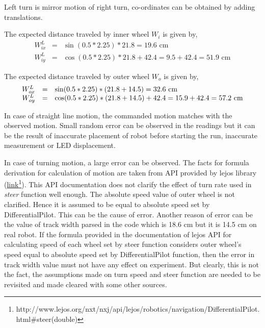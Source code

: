 \begin{enumerate}
	Left turn is mirror motion of right turn, co-ordinates can be obtained by adding translations. 
	
	The expected distance traveled by inner wheel $W_i$ is given by,
	\begin{equation}
	\begin{array}{rcl}
	W^L_{ix} &=& \sin(0.5 * 2.25) * 21.8 = 19.6 \text{ cm} \\
	W^L_{iy} &=& \cos(0.5 * 2.25) * 21.8 + 42.4 = 9.5 + 42.4 = 51.9 \text{ cm}
	\end{array}
	\end{equation}
	
	The expected distance traveled by outer wheel $W_o$ is given by,
	\begin{equation}
	\begin{array}{rcl}
	W^L_{ox} &=& \sin(0.5 * 2.25) * (21.8 + 14.5) = 32.6 \text{ cm}\\
	W^L_{oy} &=& \cos(0.5 * 2.25) * (21.8 + 14.5) + 42.4 = 15.9 + 42.4 = 57.2 \text{ cm}$$
	\end{array}
	\end{equation}
	
\end{enumerate}

In case of straight line motion, the commanded motion matches with the observed motion. Small random error can be observed in the readings but it can be the result of inaccurate placement of robot before starting the run, inaccurate measurement or LED displacement. 

In case of turning motion, a large error can be observed. The facts for formula derivation for calculation of motion are taken from API provided by lejos library (\href{http://www.lejos.org/nxt/nxj/api/lejos/robotics/navigation/DifferentialPilot.html#steer(double)}{link}\footnote{http://www.lejos.org/nxt/nxj/api/lejos/robotics/navigation/DifferentialPilot.html$\#$steer(double)}). This API documentation does not clarify the effect of turn rate used in \textit{steer} function well enough. The absolute speed value of outer wheel is not clarified. Hence it is assumed to be equal to absolute speed set by DifferentialPilot. This can be the cause of error.
Another reason of error can be the value of track width parsed in the code which is 18.6 cm but it is 14.5 cm on real robot.
If the formula provided in the documentation of lejos API for calculating speed of each wheel set by steer function considers outer wheel's speed equal to absolute speed set by DifferentialPilot function, then the error in track width value must not have any effect on experiment. But clearly, this is not the fact, the assumptions made on turn speed and steer function are needed to be revisited and made cleared with some other sources.      

